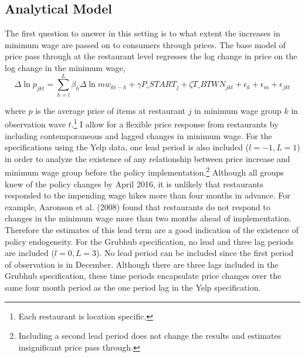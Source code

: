 \documentclass[11pt]{article}
\begin{document}

\subsection{Analytical Model}

The first question to answer in this setting is to what extent the increases in minimum wage are passed on to consumers through prices. The base model of price pass through at the restaurant level regresses the log change in price on the log change in the minimum wage,
\begin{dmath}
\Delta \ln p_{jkt} = \sum_{h=l}^{L}\beta_h \Delta \ln mw_{kt-h} + \gamma  P\_START_{j} + \zeta T\_BTWN_{jkt}   + \epsilon_k + \epsilon_m +\epsilon_{jkt}
\end{dmath}


\noindent where $p$ is the average price of items at restaurant $j$ in minimum wage group $k$ in observation wave $t$.\footnote{Each restaurant is location specific.} I allow for a flexible price response from restaurants by including contemporaneous and lagged changes in minimum wage. For the specifications using the Yelp data, one lead period is also included ($l=-1, L=1$) in order to analyze the existence of any relationship between price increase and minimum wage group before the policy implementation.\footnote{Including a second lead period does not change the results and estimates insignificant price pass through.} Although all groups knew of the policy changes by April 2016, it is unlikely that restaurants responded to the impending wage hikes more than four months in advance. For example, Aaronson et al. (2008) found that restaurants do not respond to changes in the minimum wage more than two months ahead of implementation. Therefore the estimates of this lead term are a good indication of the existence of policy endogeneity. For the Grubhub specification, no lead and three lag periods are included ($l=0, L=3$). No lead period can be included since the first period of observation is in December. Although there are three lags included in the Grubhub specification, these time periods encapsulate price changes over the same four month period as the one period lag in the Yelp specification. 
\end{document}
